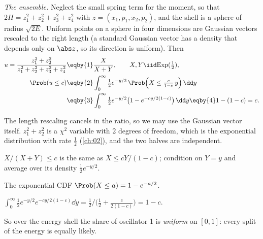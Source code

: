 \emph{The ensemble.} Neglect the small spring term for the moment, so that
$2H=z_1^2+z_2^2+z_3^2+z_4^2$ with $z=(x_1,p_1,x_2,p_2)$, and the shell is a sphere of radius
$\sqrt{2E}$. Uniform points on a sphere in four dimensions are Gaussian vectors rescaled to
the right length (a standard Gaussian vector has a density that depends only on $\abs z$, so
its direction is uniform). Then
\begin{align}
  u=\frac{z_1^2+z_2^2}{z_1^2+z_2^2+z_3^2+z_4^2}
  &\eqby{1} \frac{X}{X+Y},\qquad X,Y\iid\mathrm{Exp}(\tfrac12), \nonumber\\
  \Prob(u\le c)
  &\eqby{2} \int_0^\infty \tfrac12e^{-y/2}\,
      \Prob\Bigl(X\le \tfrac{c}{1-c}\,y\Bigr)\,\dd y \nonumber\\
  &\eqby{3} \int_0^\infty \tfrac12e^{-y/2}\bigl(1-e^{-cy/2(1-c)}\bigr)\,\dd y
   \eqby{4} 1-(1-c)=c .
  \label{9a:eq:shell-uniform}
\end{align}
\begin{explain}
  \item The length rescaling cancels in the ratio, so we may use the Gaussian vector itself.
        $z_1^2+z_2^2$ is a $\chi^2$ variable with 2 degrees of freedom, which is the
        exponential distribution with rate $\tfrac12$ (\cref{ch:02}), and the two halves
        are independent.
  \item $X/(X+Y)\le c$ is the same as $X\le cY/(1-c)$; condition on $Y=y$ and average over its
        density $\tfrac12e^{-y/2}$.
  \item The exponential CDF $\Prob(X\le a)=1-e^{-a/2}$.
  \item $\int_0^\infty\tfrac12e^{-y/2}e^{-cy/2(1-c)}\dd y=\tfrac12\big/\bigl(\tfrac12+\tfrac{c}{2(1-c)}\bigr)=1-c$.
\end{explain}
So over the energy shell the share of oscillator 1 is \emph{uniform} on $[0,1]$: every split
of the energy is equally likely.

